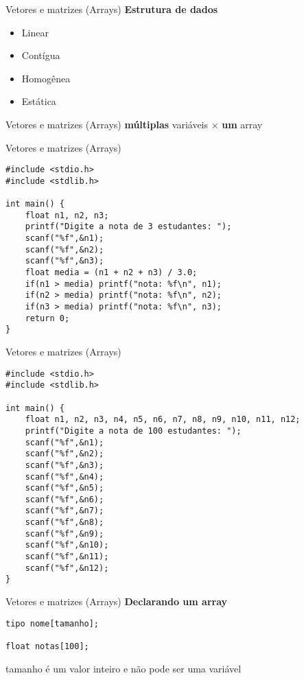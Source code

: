 \documentclass[10pt]{beamer}
\subtitle{Aula 2}
\date{30 de outubro de 2019}
\begin{document}
\maketitle

\begin{frame}{Vetores e matrizes (Arrays)}
    \huge
    \textbf{Estrutura de dados}

    \begin{itemize}
        \item Linear
        \item Contígua
        \item Homogênea
        \item Estática
    \end{itemize}
\end{frame}

\begin{frame}{Vetores e matrizes (Arrays)}
    \huge \textbf{múltiplas} variáveis $\times$ \textbf{um} array
\end{frame}

\begin{frame}[fragile]{Vetores e matrizes (Arrays)}
    \begin{verbatim}
#include <stdio.h>
#include <stdlib.h>

int main() {
    float n1, n2, n3;
    printf("Digite a nota de 3 estudantes: ");
    scanf("%f",&n1);
    scanf("%f",&n2);
    scanf("%f",&n3);
    float media = (n1 + n2 + n3) / 3.0;
    if(n1 > media) printf("nota: %f\n", n1);
    if(n2 > media) printf("nota: %f\n", n2);
    if(n3 > media) printf("nota: %f\n", n3);
    return 0;
}
    \end{verbatim}
\end{frame}

\begin{frame}[fragile]{Vetores e matrizes (Arrays)}
    \begin{verbatim}
#include <stdio.h>
#include <stdlib.h>

int main() {
    float n1, n2, n3, n4, n5, n6, n7, n8, n9, n10, n11, n12;
    printf("Digite a nota de 100 estudantes: ");
    scanf("%f",&n1);
    scanf("%f",&n2);
    scanf("%f",&n3);
    scanf("%f",&n4);
    scanf("%f",&n5);
    scanf("%f",&n6);
    scanf("%f",&n7);
    scanf("%f",&n8);
    scanf("%f",&n9);
    scanf("%f",&n10);
    scanf("%f",&n11);
    scanf("%f",&n12);
}
    \end{verbatim}
\end{frame}

\begin{frame}[fragile]{Vetores e matrizes (Arrays)}
    \huge
    \textbf{Declarando um array}

    \bigskip

    \begin{verbatim}
tipo nome[tamanho];

float notas[100];
    \end{verbatim}

    \Large
    tamanho é um valor inteiro e não pode ser uma variável
\end{frame}
\end{document}
